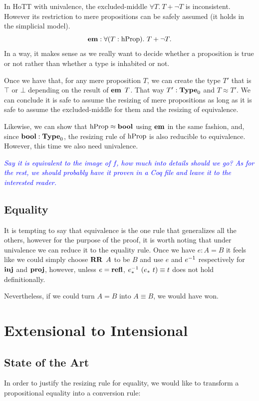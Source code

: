 \documentclass[11pt]{article}
\theoremstyle{plain}
\theoremstyle{remark}
\newcommand\meta[1]{\noindent\textcolor{blue}{\emph{#1}}}
\begin{document}
In HoTT with univalence, the excluded-middle $\forall T.\ T + \neg T$ is
inconsistent. However its restriction to mere propositions can be safely
assumed (it holds in the simplicial model).
\[\operatorname{\mathbf{em}} : \forall (T:\operatorname{hProp}).\ T + \neg T.\]
In a way, it makes sense as we really want to decide whether a proposition is
true or not rather than whether a type is inhabited or not.

Once we have that, for any mere proposition $T$, we can create the type $T'$
that is $\top$ or $\bot$ depending on the result of $\operatorname{\mathbf{em}}\ T$.
That way $T' : \operatorname{\mathbf{Type}}_0$ and $T \approx T'$.
We can conclude it is safe to assume the resizing of mere propositions as long
as it is safe to assume the excluded-middle for them and the resizing of
equivalence.

Likewise, we can show that $\operatorname{hProp} \approx \operatorname{\mathbf{bool}}$ using $\operatorname{\mathbf{em}}$ in the same
fashion, and, since $\operatorname{\mathbf{bool}} : \operatorname{\mathbf{Type}}_0$, the resizing rule of $\operatorname{hProp}$ is also
reducible to equivalence. However, this time we also need univalence.

\meta{Say it is equivalent to the image of $f$, how much into details should we
go? As for the rest, we should probably have it proven in a Coq file and leave
it to the interested reader.}

\subsection{Equality}
It is tempting to say that equivalence is the one rule that generalizes all the
others, however for the purpose of the proof, it is worth noting that under
univalence we can reduce it to the equality rule.
Once we have $e : A = B$ it feels like we could simply choose $\RR\ A$ to be
$B$ and use $e$ and $e^{-1}$ respectively for $\operatorname{\mathbf{inj}}$ and $\operatorname{\mathbf{proj}}$,
however, unless $e = \operatorname{\mathbf{refl}}$, $e^{-1}_*\ (e_*\ t) \equiv t$ does not hold
definitionally.

Nevertheless, if we could turn $A = B$ into $A \equiv B$, we would have won.

\section{Extensional to Intensional}

\subsection{State of the Art}

In order to justify the resizing rule for equality, we would like to transform
a propositional equality into a conversion rule:
\end{document}

